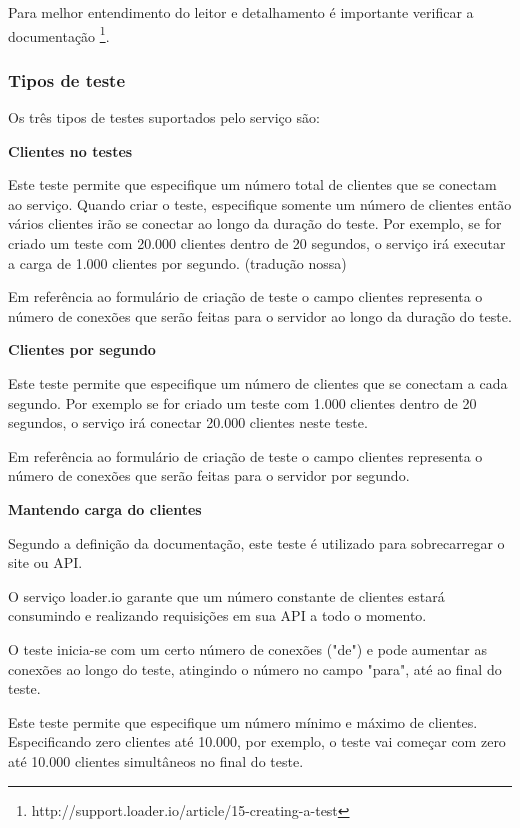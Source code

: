   Para melhor entendimento do leitor e detalhamento é importante verificar 
  a documentação \footnote{http://support.loader.io/article/15-creating-a-test}.
  
\subsubsection{Tipos de teste}
  
  Os três tipos de testes suportados pelo serviço são:
  
  \textbf{Clientes no testes}
  
  Este teste permite que especifique um número total de clientes que se conectam ao serviço. Quando criar o teste,
  especifique somente um número de clientes então vários clientes irão se conectar ao longo da duração do teste. 
  Por exemplo, se for criado um teste com 20.000 clientes dentro de 20 segundos, o serviço irá executar a carga de 
  1.000 clientes por segundo. (tradução nossa)
  
  Em referência ao formulário de criação de teste o campo clientes representa o número de conexões que serão
  feitas para o servidor ao longo da duração do teste.
  
  \textbf{Clientes por segundo}
  
  Este teste permite que especifique um número de clientes que se conectam a cada segundo. Por exemplo se for criado
  um teste com 1.000 clientes dentro de 20 segundos, o serviço irá conectar 20.000 clientes neste teste.
  
  Em referência ao formulário de criação de teste o campo clientes representa o número de conexões que serão
  feitas para o servidor por segundo.
  
  \textbf{Mantendo carga do clientes}
  
  Segundo a definição da documentação, este teste é utilizado para sobrecarregar o site ou \ac{API}.
  
  O serviço loader.io garante que um número constante de clientes estará consumindo e realizando requisições em 
  sua \ac{API} a todo o momento.
  
  O teste inicia-se com um certo número de conexões ("de")  e pode aumentar as conexões ao longo do teste, 
  atingindo o número no campo "para", até ao final do teste. 
  
  Este teste permite que especifique um número mínimo e máximo de clientes. Especificando zero clientes
  até 10.000, por exemplo, o teste vai começar com zero até 10.000 clientes simultâneos no final do teste.
  
